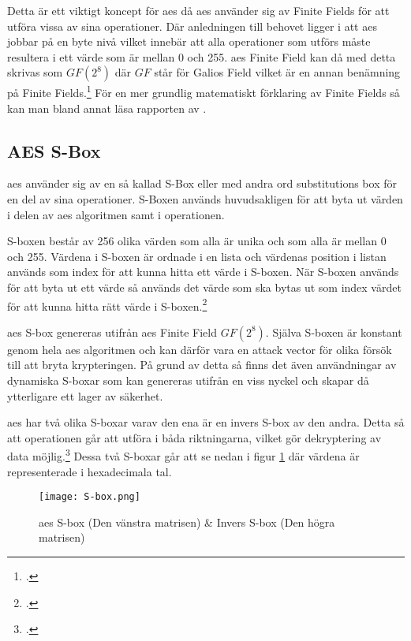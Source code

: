 Detta är ett viktigt koncept för \acrshort{aes} då \acrshort{aes} använder sig av
Finite Fields för att utföra vissa av sina operationer. Där anledningen till behovet
ligger i att \acrshort{aes} jobbar på en byte nivå vilket innebär att alla operationer
som utförs måste resultera i ett värde som är mellan 0 och 255. \acrshort{aes} Finite Field
kan då med detta skrivas som $GF(2^8)$ där $GF$ står för Galios Field vilket är
en annan benämning på Finite Fields.\footcite{finitefield_wiki} För en mer grundlig matematiskt förklaring av Finite Fields så kan man bland annat läsa rapporten
 av \citeauthor{boman2016andliga}.

\subsection{AES S-Box}
\label{sec:aes-sbox}
\acrshort{aes} använder sig av en så kallad S-Box eller med andra ord substitutions box
för en del av sina operationer. S-Boxen används huvudsakligen för att byta ut värden
i  delen av \acrshort{aes} algoritmen samt i
 operationen.

S-boxen består av 256 olika värden som alla är unika och som alla är mellan 0 och 255.
Värdena i S-boxen är ordnade i en lista och värdenas position i listan används som
index för att kunna hitta ett värde i S-boxen. När S-boxen används för att byta ut
ett värde så används det värde som ska bytas ut som index värdet för att kunna hitta
rätt värde i S-boxen.\footcite{sbox_wiki}

\acrshort{aes} S-box genereras utifrån \acrshort{aes} Finite Field {$GF(2^8)$}.
Själva S-boxen är konstant genom hela \acrshort{aes} algoritmen och kan därför
vara en attack vector för olika försök till att bryta krypteringen. På grund av
detta så finns det även användningar av dynamiska S-boxar som kan genereras
utifrån en viss nyckel och skapar då ytterligare ett lager av säkerhet.

\acrshort{aes} har två olika S-boxar varav den ena är en invers S-box av den andra.
Detta så att operationen går att utföra i båda riktningarna, vilket gör dekryptering
av data möjlig.\footcite{sbox_wiki} Dessa två S-boxar går att se nedan i figur \ref{fig:aes-sbox} där
värdena är representerade i hexadecimala tal. %

\begin{figure}[H]
    \texttt{[image: S-box.png]}
    \caption{\acrshort{aes} S-box (Den vänstra matrisen) \& Invers S-box (Den högra matrisen) \cite{sbox_wiki}}
    \label{fig:aes-sbox}
\end{figure}


